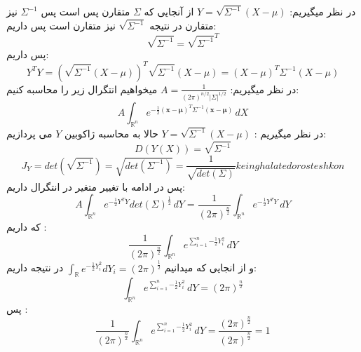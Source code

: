 \parte{}

\parte{}
در نظر میگیریم:
$Y = \sqrt{\Sigma ^{-1}}(X-\mu)$
از آنجایی که $\Sigma$ متقارن پس است پس $\Sigma^{-1}$ نیز متقارن 
در نتیجه $\sqrt{\Sigma^{-1}}$ نیز متقارن است پس داریم:\\
\[\sqrt{\Sigma^{-1}} = \sqrt{\Sigma^{-1}}^{T} \]
پس داریم:\\
\[ Y^{T}Y = (\sqrt{\Sigma ^{-1}}(X-\mu))^{T}\sqrt{\Sigma ^{-1}}(X-\mu) = (X-\mu)^{T}\Sigma^{-1}(X-\mu) \]
\parte{}
در نظر میگیریم:
$A = \frac{1}{{(2\pi)^{n/2} |\Sigma|^{1/2}}} $
میخواهیم انتگرال زیر را محاسبه کنیم:\\
\[
A \int_{\mathbb{R}^{n}} e^{-\frac{1}{2} (\mathbf{x}-\boldsymbol{\mu})^T \Sigma^{-1} (\mathbf{x}-\boldsymbol{\mu})} \, d{X}
\]
در نظر میگیریم : 
$Y = \sqrt{\Sigma ^{-1}}(X-\mu)$ حالا به محاسبه ژاکوبین $Y$  می پردازیم:\\

\[D(Y(X)) = \sqrt{\Sigma^{-1}}\]
\[J_{Y} = det(\sqrt{\Sigma^{-1}}) =\sqrt{det(\Sigma^{-1})} = \frac{1}{\sqrt{det(\Sigma)}}ke in ghalate dorostesh kon  \]
پس در ادامه با تغییر متغیر در انتگرال داریم:\\
\[A \int_{\mathbb{R}^{n}} e^{-\frac{1}{2} Y^{T}Y} {det(\Sigma)}^{\frac{1}{2}}\, d{Y} = \frac{1}{(2\pi)^{\frac{n}{2}}}\int_{\mathbb{R}^{n}} e^{-\frac{1}{2} Y^{T}Y} \, d{Y}\]
که داریم :\\
\[ \frac{1}{(2\pi)^{\frac{n}{2}}}\int_{\mathbb{R}^{n}} e^{\sum_{i = 1}^{n}{-\frac{1}{2}Y_{i}^2} } \, d{Y} \]
و از انجایی که میدانیم $\int_{\mathbb{R}}{e^{-\frac{1}{2}Y_{i}^2}}d{Y_{i}} = (2\pi)^{\frac{1}{2}}$ در نتیجه داریم:
\[ \int_{\mathbb{R}^{n}} e^{\sum_{i = 1}^{n}{-\frac{1}{2}Y_{i}^2} } \, d{Y} = (2\pi)^{\frac{n}{2}}\] پس :\\

\[ \frac{1}{(2\pi)^{\frac{n}{2}}}\int_{\mathbb{R}^{n}} e^{\sum_{i = 1}^{n}{-\frac{1}{2}Y_{i}^2} } \, d{Y}  = \frac{(2\pi)^{\frac{n}{2}}}{(2\pi)^{\frac{n}{2}}} = 1\]

